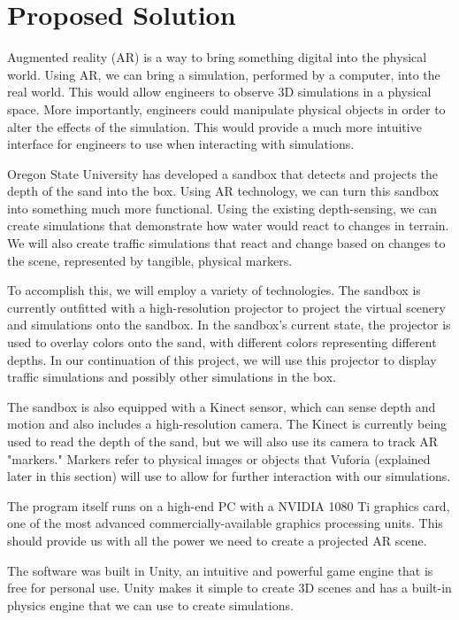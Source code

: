 \documentclass{article}
\begin{document}
\section{Proposed Solution}
Augmented reality (AR) is a way to bring something digital into the physical world. Using AR, we can bring a simulation, performed by a computer, into the real world. This would allow engineers to observe 3D simulations in a physical space. More importantly, engineers could manipulate physical objects in order to alter the effects of the simulation. This would provide a much more intuitive interface for engineers to use when interacting with simulations.

Oregon State University has developed a sandbox that detects and projects the depth of the sand into the box. Using AR technology, we can turn this sandbox into something much more functional. Using the existing depth-sensing, we can create simulations that demonstrate how water would react to changes in terrain. We will also create traffic simulations that react and change based on changes to the scene, represented by tangible, physical markers.

To accomplish this, we will employ a variety of technologies. The sandbox is currently outfitted with a high-resolution projector to project the virtual scenery and simulations onto the sandbox. In the sandbox's current state, the projector is used to overlay colors onto the sand, with different colors representing different depths. In our continuation of this project, we will use this projector to display traffic simulations and possibly other simulations in the box.

The sandbox is also equipped with a Kinect sensor, which can sense depth and motion and also includes a high-resolution camera. The Kinect is currently being used to read the depth of the sand, but we will also use its camera to track AR "markers." Markers refer to physical images or objects that Vuforia (explained later in this section) will use to allow for further interaction with our simulations.

The program itself runs on a high-end PC with a NVIDIA 1080 Ti graphics card, one of the most advanced commercially-available graphics processing units. This should provide us with all the power we need to create a projected AR scene. 

The software was built in Unity, an intuitive and powerful game engine that is free for personal use. Unity makes it simple to create 3D scenes and has a built-in physics engine that we can use to create simulations.
\end{document}
